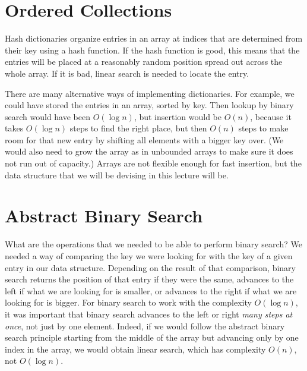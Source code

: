 \section{Ordered Collections}
\label{ch:bst:intro_ordered}

Hash dictionaries organize entries in an array at indices that are
determined from their key using a hash function.  If the hash function
is good, this means that the entries will be placed at a reasonably
random position spread out across the whole array. If it is bad,
linear search is needed to locate the entry.

There are many alternative ways of implementing dictionaries.  For
example, we could have stored the entries in an array, sorted by key.
Then lookup by binary search would have been $O(\log n)$, but
insertion would be $O(n)$, because it takes $O(\log n)$ steps to find
the right place, but then $O(n)$ steps to make room for that new entry
by shifting all elements with a bigger key over.  (We would also need
to grow the array as in unbounded arrays to make sure it does not run
out of capacity.)  Arrays are not flexible enough for fast insertion,
but the data structure that we will be devising in this lecture will
be.


\section{Abstract Binary Search}
\label{sec:bst:abstracting_binsearch}

What are the operations that we needed to be able to perform binary
search?  We needed a way of comparing the key we were looking for with
the key of a given entry in our data structure.  Depending on the
result of that comparison, binary search returns the position of that
entry if they were the same, advances to the left if what we are
looking for is smaller, or advances to the right if what we are
looking for is bigger.  For binary search to work with the complexity
$O(\log n)$, it was important that binary search advances to the left
or right \emph{many steps at once}, not just by one element.  Indeed,
if we would follow the abstract binary search principle starting from
the middle of the array but advancing only by one index in the array,
we would obtain linear search, which has complexity $O(n)$, not
$O(\log n)$.

